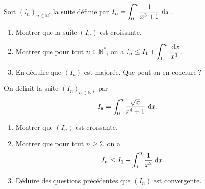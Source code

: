 %
\begin{exo}
      Soit $(I_n)_{n\in\mathbb{N}^*}$ la suite d\'efinie par 
            $\displaystyle{
                  I_n = \int_{0}^{n} \frac{1}{x^3 + 1} ~\mathrm{d}x}$.
      \begin{enumerate}
            \item Montrer que la suite $(I_n)$ est croissante.
            \item Montrer que pour tout $n\in\mathbb{N}^*$, on a 
                  $\displaystyle{
                        I_n \leq I_1 + \int_{1}^{n} \frac{~\mathrm{d}x}{x^3}
                  }$.
            \item En d\'eduire que $(I_n)$ est major\'ee. Que peut-on en conclure\,?
      \end{enumerate}
\end{exo}
%
\begin{exo}
      On d\'efinit la suite $(I_n)_{n\in\mathbb{N}*}$ par 
            \[
                  I_n = \int_{0}^{n} \frac{\sqrt{x}}{x^4+1} ~\mathrm{d}x       .
            \]
      \begin{enumerate}
            \item Montrer que $(I_n)$ est croissante.
            \item Montrer que pour tout $n\geq 2$, on a 
                  \[
                        I_n \leq I_1 + \int_{1}^{n} \frac{1}{x^2} ~\mathrm{d}x      .
                  \]
            \item D\'eduire des questions pr\'ec\'edentes que $(I_n)$ est convergente.
      \end{enumerate}
\end{exo}
%
